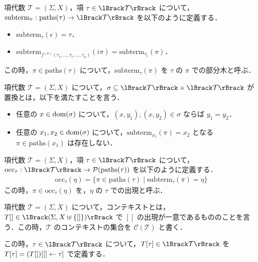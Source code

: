 \begin{definition}
  項代数 $\mathcal{T} = (\Sigma, X)$，項 $\tau \in \semanticf{\mathcal{T}}$ について，$\mathrm{subterm}_\tau: \mathrm{paths}(\tau) \to \semanticf{\mathcal{T}}$ を以下のように定義する．
  \begin{itemize}
    \item $\mathrm{subterm}_\tau(\epsilon) = \tau$．
    \item $\mathrm{subterm}_{f^{(n)}(\tau_1, \ldots, \tau_i, \ldots, \tau_n)}(i\pi) = \mathrm{subterm}_{\tau_i}(\pi)$．
  \end{itemize}
  この時，$\pi \in \mathrm{paths}(\tau)$ について，$\mathrm{subterm}_\tau(\pi)$ を $\tau$ の $\pi$ での部分木と呼ぶ．
\end{definition}

\begin{definition}[置換 (substitution)]
  項代数 $\mathcal{T} = (\Sigma, X)$ について，$\sigma \subseteq \semanticf{\mathcal{T}} \times \semanticf{\mathcal{T}}$ が置換とは，以下を満たすことを言う．
  \begin{itemize}
    \item 任意の $x \in \mathop{\mathrm{dom}}(\sigma)$ について，$(x, y_1), (x, y_2) \in \sigma$ ならば $y_1 = y_2$．
    \item 任意の $x_1, x_2 \in \mathop{\mathrm{dom}}(\sigma)$ について，$\mathrm{subterm}_{x_1}(\pi) = x_2$ となる $\pi \in \mathrm{paths}(x_1)$ は存在しない．
  \end{itemize}
\end{definition}

\begin{definition}[出現 (occurence)]
  項代数 $\mathcal{T} = (\Sigma, X)$，項 $\tau \in \semanticf{\mathcal{T}}$ について，$\mathrm{occ}_\tau: \semanticf{\mathcal{T}} \to \Power(\mathrm{paths}(\tau))$ を以下のように定義する．
  \begin{align*}
    \mathrm{occ}_\tau(\eta) = \{\pi \in \mathrm{paths}(\tau) \mid \mathrm{subterm}_\tau(\pi) = \eta\}
  \end{align*}
  この時，$\pi \in \mathrm{occ}_\tau(\eta)$ を，$\eta$ の $\tau$ での出現と呼ぶ．
\end{definition}

\begin{definition}
  項代数 $\mathcal{T} = (\Sigma, X)$ について，コンテキストとは，$T[] \in \semanticf{(\Sigma, X \uplus \{[]\})}$ で $[]$ の出現が一意であるもののことを言う．この時，$\mathcal{T}$ のコンテキストの集合を $\mathcal{C}(\mathcal{T})$ と書く．

  この時，$\tau \in \semanticf{\mathcal{T}}$ について，$T[\tau] \in \semanticf{\mathcal{T}}$ を $T[\tau] = (T[])[[] \gets \tau]$ で定義する．
\end{definition}
